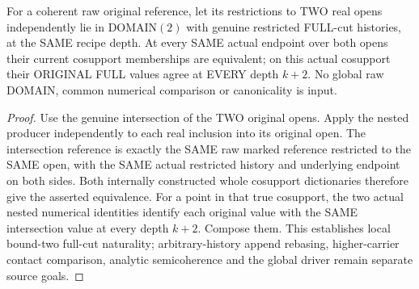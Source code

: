 \begin{theorem}
\label{hir:original-bound-two-full-cut-two-open-locality}
\leanok
For a coherent raw original reference, let its restrictions to TWO real
opens independently lie in DOMAIN$(2)$ with genuine restricted FULL-cut
histories, at the SAME recipe depth. At every SAME actual endpoint over
both opens their current cosupport memberships are equivalent; on this
actual cosupport their ORIGINAL FULL values agree at EVERY depth $k+2$.
No global raw DOMAIN, common numerical comparison or canonicality is input.
\end{theorem}
\begin{proof}
Use the genuine intersection of the TWO original opens. Apply the nested
producer independently to each real inclusion into its original open.
The intersection reference is exactly the SAME raw marked reference
restricted to the SAME open, with the SAME actual restricted history and
underlying endpoint on both sides. Both internally constructed whole
cosupport dictionaries therefore give the asserted equivalence.
For a point in that true cosupport, the two actual nested numerical
identities identify each original value with the SAME intersection value
at every depth $k+2$. Compose them. This establishes local bound-two
full-cut naturality; arbitrary-history append rebasing, higher-carrier
contact comparison, analytic semicoherence and the global driver remain
separate source goals.
\end{proof}
